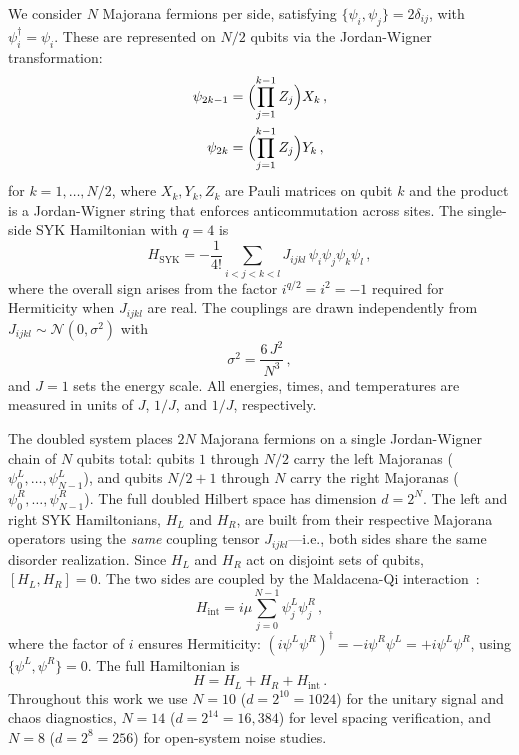 \documentclass[aps,prd,twocolumn,superscriptaddress,nofootinbib,floatfix]{revtex4-2}
\begin{document}
We consider $N$ Majorana fermions per side, satisfying
$\{\psi_i, \psi_j\} = 2\delta_{ij}$, with $\psi_i^\dagger = \psi_i$.
These are represented on $N/2$ qubits via the Jordan-Wigner transformation:
\begin{align}
  \psi_{2k-1} &= \Bigl(\prod_{j=1}^{k-1} Z_j\Bigr) X_k\,,
  \label{eq:jw_odd} \\
  \psi_{2k}   &= \Bigl(\prod_{j=1}^{k-1} Z_j\Bigr) Y_k\,,
  \label{eq:jw_even}
\end{align}
for $k = 1, \ldots, N/2$, where $X_k, Y_k, Z_k$ are Pauli matrices on
qubit $k$ and the product is a Jordan-Wigner string that enforces
anticommutation across sites.
The single-side SYK Hamiltonian with $q=4$ is
\begin{equation}
  H_\mathrm{SYK} = -\frac{1}{4!}\sum_{i<j<k<l} J_{ijkl}\,
    \psi_i \psi_j \psi_k \psi_l \,,
\label{eq:syk}
\end{equation}
where the overall sign arises from the factor $i^{q/2} = i^2 = -1$ required
for Hermiticity when $J_{ijkl}$ are real. The couplings are drawn
independently from $J_{ijkl} \sim \mathcal{N}(0, \sigma^2)$ with
\begin{equation}
  \sigma^2 = \frac{6\,J^2}{N^3}\,,
  \label{eq:variance}
\end{equation}
and $J=1$ sets the energy scale. All energies, times, and temperatures are
measured in units of $J$, $1/J$, and $1/J$, respectively.

The doubled system places $2N$ Majorana fermions on a single Jordan-Wigner
chain of $N$ qubits total: qubits $1$ through $N/2$ carry the left
Majoranas ($\psi_0^L, \ldots, \psi_{N-1}^L$), and qubits $N/2+1$ through
$N$ carry the right Majoranas ($\psi_0^R, \ldots, \psi_{N-1}^R$). The full
doubled Hilbert space has dimension $d = 2^N$. The left and right SYK
Hamiltonians, $H_L$ and $H_R$, are built from their respective Majorana
operators using the \emph{same} coupling tensor $J_{ijkl}$---i.e., both
sides share the same disorder realization. Since $H_L$ and $H_R$ act on
disjoint sets of qubits, $[H_L, H_R] = 0$. The two sides are coupled by
the Maldacena-Qi interaction~\cite{Maldacena:2018lmt}:
\begin{equation}
  H_\mathrm{int} = i\mu \sum_{j=0}^{N-1} \psi_j^L \psi_j^R\,,
  \label{eq:hint}
\end{equation}
where the factor of $i$ ensures Hermiticity:
$(i\psi^L\psi^R)^\dagger = -i\psi^R\psi^L = +i\psi^L\psi^R$, using
$\{\psi^L, \psi^R\} = 0$. The full Hamiltonian is
\begin{equation}
  H = H_L + H_R + H_\mathrm{int}\,.
  \label{eq:full_H}
\end{equation}
Throughout this work we use $N=10$ ($d = 2^{10} = 1024$) for the unitary
signal and chaos diagnostics, $N=14$ ($d = 2^{14} = 16{,}384$) for level
spacing verification, and $N=8$ ($d = 2^8 = 256$) for open-system noise
studies.
\end{document}
